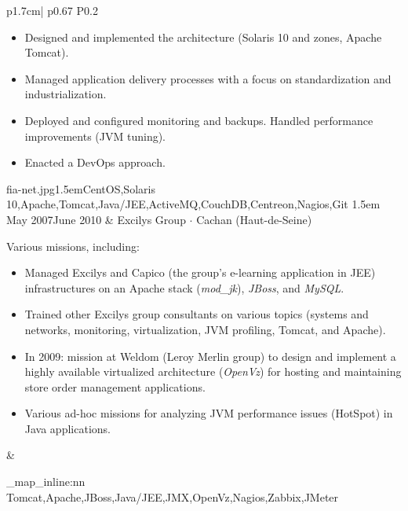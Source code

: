 \documentclass[darkhipster]{hipstercv}
\newcommand{\cvtags}[1] {
    \clist_map_inline:nn { #1 }
    {
        \cvtag{##1} %
    }
}
\newcommand{\cveventdetailed}[9]{
    {\small #1} &
    {#2 $\cdot$ \small{{#4 ~\faMapMarker}}}\vspace{.5em}\newline
    {\color{black!70}\footnotesize #5\vspace{#9}} &
    {\raisebox{-0.7\height}{\texttt{[image: \#6]}}} \vspace{#7}
    {\par \small \cvtags{#8}}
}
\begin{document}
\begin{longtable}{p{1.7cm}| p{} P{0.2\textwidth}}
{            \begin{itemize}
                \item Designed and implemented the architecture (Solaris 10 and zones, Apache Tomcat).
                \item Managed application delivery processes with a focus on standardization and industrialization.
                \item Deployed and configured monitoring and backups. Handled performance improvements (JVM tuning).
                \item Enacted a DevOps approach.
            \end{itemize}
        }
        {fia-net.jpg}{1.5em}{CentOS,Solaris 10,Apache,Tomcat,Java/JEE,ActiveMQ,CouchDB,Centreon,Nagios,Git}
        {1.5em} \\
    \cveventdetailed
        {May 2007\newline June 2010}
        {Excilys Group}
        {SRE/Architect}
        {Cachan (Haut-de-Seine)\color{cvred}}
        {
            Various missions, including:
            \begin{itemize}
                \item Managed Excilys and Capico (the group's e-learning application in JEE) infrastructures on an Apache stack (\emph{mod\_jk}), \emph{JBoss}, and \emph{MySQL}.
                \item Trained other Excilys group consultants on various topics (systems and networks, monitoring, virtualization, JVM profiling, Tomcat, and Apache).
                \item In 2009: mission at Weldom (Leroy Merlin group) to design and implement a highly available virtualized architecture (\emph{OpenVz}) for hosting and maintaining store order management applications.
                \item Various ad-hoc missions for analyzing JVM performance issues (HotSpot) in Java applications.
            \end{itemize}
        }
        {excilys.png}{0em}{Tomcat,Apache,JBoss,Java/JEE,JMX,OpenVz,Nagios,Zabbix,JMeter}
        {0em} \\
\end{longtable}
\end{document}
